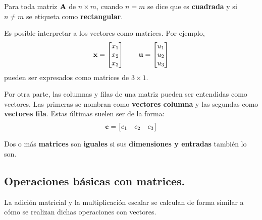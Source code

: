 \documentclass[12pt]{article}
\begin{document}
Para toda matriz $\mathbf{A}$ de $n \times m$, cuando $n = m$ se dice que es \textbf{cuadrada} y si $n \neq m$ se etiqueta como \textbf{rectangular}.

Es posible interpretar a los vectores como matrices. Por ejemplo,
\[
\mathbf{x} =
\begin{bmatrix}
x_{1} \\x_{2} \\ x_{3}
\end{bmatrix} \qquad
\mathbf{u} =
\begin{bmatrix}
u_{1} \\u_{2} \\ u_{3}
\end{bmatrix}
\]
pueden ser expresados como matrices de $3 \times 1$.

Por otra parte, las columnas y filas de una matriz pueden ser entendidas como vectores. Las primeras se nombran como \textbf{vectores columna} y las segundas como \textbf{vectores fila}. Estas últimas suelen ser de la forma:
\[
\mathbf{c} =
\begin{bmatrix}
c_{1} & c_{2} & c_{3}
\end{bmatrix}
\]

Dos o más \textbf{matrices} son \textbf{iguales} si sus \textbf{dimensiones y entradas} también lo son.

\subsection{Operaciones básicas con matrices.}

La adición matricial y la multiplicación escalar se calculan de forma similar a cómo se realizan dichas operaciones con vectores.
\end{document}
